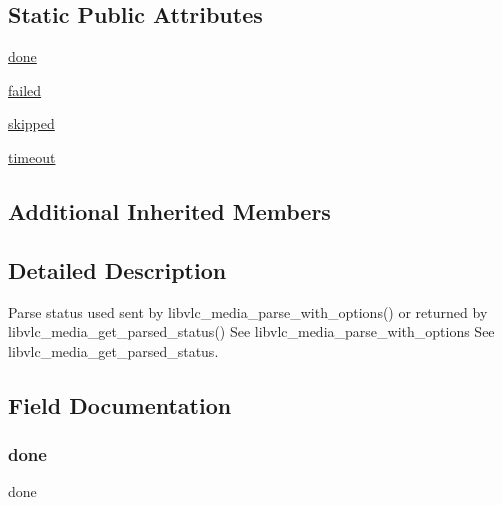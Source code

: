 \subsection*{Static Public Attributes}
\begin{DoxyCompactItemize}
\item 
\hyperlink{classvlc_1_1_media_parsed_status_ad604cff3eb5d475cdc9f8eb5ab570fee}{done}
\item 
\hyperlink{classvlc_1_1_media_parsed_status_a4af14f376aef238cb4e75252d40eeb82}{failed}
\item 
\hyperlink{classvlc_1_1_media_parsed_status_a6f6251d137c8fd62803a5cba46d587a7}{skipped}
\item 
\hyperlink{classvlc_1_1_media_parsed_status_aee145bfca8e9b2eaf3cd3c47157be9a3}{timeout}
\end{DoxyCompactItemize}
\subsection*{Additional Inherited Members}


\subsection{Detailed Description}
\begin{DoxyVerb}Parse status used sent by libvlc_media_parse_with_options() or returned by
libvlc_media_get_parsed_status()
See libvlc_media_parse_with_options
See libvlc_media_get_parsed_status.
\end{DoxyVerb}
 

\subsection{Field Documentation}
\mbox{\label{classvlc_1_1_media_parsed_status_ad604cff3eb5d475cdc9f8eb5ab570fee}} 
\subsubsection{\texorpdfstring{done}{done}}
{\footnotesize\ttfamily done\hspace{0.3cm}{\ttfamily [static]}}

\mbox{\label{classvlc_1_1_media_parsed_status_a4af14f376aef238cb4e75252d40eeb82}} 
